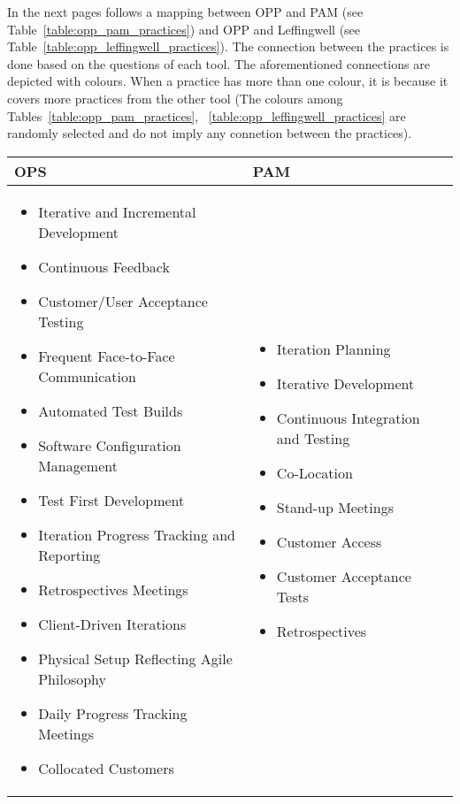 In the next pages follows a mapping between OPP and PAM (see Table~\ref{table:opp_pam_practices}) and OPP and Leffingwell (see Table~\ref{table:opp_leffingwell_practices}). The connection between the practices is done based on the questions of each tool. The aforementioned connections are depicted with colours. When a practice has more than one colour, it is because it covers more practices from the other tool {\footnotesize (The colours among  Tables~\ref{table:opp_pam_practices}, ~\ref{table:opp_leffingwell_practices} are randomly selected and do not imply any connetion between the practices)}.

\begin{tabular}{| p{7.5cm} | p{7cm} |}
	\hline
	\textbf{OPS} & \textbf{PAM}  \\ \hline
     	\begin{itemize}
     		\item {\color{RoyalBlue1}Iterative} {\color{DarkMagenta}and Incremental Development} 
     		\item {\color{DarkBlue}Continuous Feedback} 
     		\item {\color{red2}Customer/User Acceptance Testing} 
     		\item {\color{DarkBlue}Frequent Face-to-Face} {\color{MediumAquamarine}Communication} 
     		\item {\color{DarkOrange1}Automated Test Builds} 
     		\item {\color{DarkOrange1}Software Configuration Management} 
     		\item {\color{DarkOrange1}Test First Development} 
     		\item {\color{RoyalBlue1}Iteration Progress Tracking and Reporting}
     		\item {\color{DarkRed}Retrospectives Meetings} 
     		\item {\color{DarkBlue}Client-Driven} {\color{RoyalBlue1}Iterations}
     		\item {\color{MediumAquamarine}Physical Setup Reflecting Agile Philosophy} 
     		\item {\color{green4}Daily Progress Tracking Meetings} 
     		\item {\color{DarkBlue}Collocated} {\color{MediumAquamarine}Customers}
 		\end{itemize} 
 		& \begin{itemize}
 			\item {\color{RoyalBlue1}Iteration Planning} 
 			\item {\color{DarkMagenta}Iterative Development} 
 			\item {\color{DarkOrange1}Continuous Integration and Testing} 
 			\item {\color{MediumAquamarine}Co-Location} 
 			\item {\color{green4}Stand-up Meetings} 
 			\item {\color{DarkBlue}Customer Access} 
 			\item {\color{red2}Customer Acceptance Tests} 
 			\item {\color{DarkRed}Retrospectives} 
 		\end{itemize}
     \\ \hline
\end{tabular}
